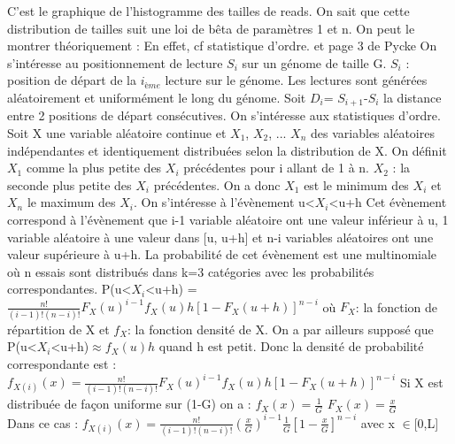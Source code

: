 \documentclass[12pt]{article}
\begin{document}
C'est le graphique de l'histogramme des tailles de reads.
On sait que cette distribution de tailles suit une loi de bêta de paramètres 1 et n.
On peut le montrer théoriquement :
En effet, cf statistique d'ordre. et page 3 de Pycke
On s'intéresse au positionnement de lecture $S_{i}$ sur un génome de taille G. $S_{i}$ : position de départ de la $i_{ème}$ lecture sur le génome.
Les lectures sont générées aléatoirement et uniformément le long du génome.
Soit $D_{i}$= $S_{i+1}$-$S_{i}$ la distance entre 2 positions de départ consécutives.
On s'intéresse aux statistiques d'ordre.
Soit X une variable aléatoire continue et $X_{1}$, $X_{2}$, ... $X_{n}$ des variables aléatoires indépendantes et identiquement distribuées selon la distribution de X.
On définit $X_{1}$ comme la plus petite des $X_{i}$ précédentes pour i allant de 1 à n.
$X_{2}$ : la seconde plus petite des $X_{i}$ précédentes.
On a donc $X_{1}$ est le minimum des $X_{i}$ et $X_{n}$ le maximum des $X_{i}$.
On s'intéresse à l'évènement u<$X_{i}$<u+h
Cet évènement correspond à l'évènement que i-1 variable aléatoire ont une valeur inférieur à u, 1 variable aléatoire à une valeur dans [u, u+h] et n-i variables aléatoires ont une valeur supérieure à u+h.
La probabilité de cet évènement est une multinomiale où n essais sont distribués dans k=3 catégories avec les probabilités correspondantes.
P(u<$X_{i}$<u+h) = $\frac{n!}{(i-1)!(n-i)!} F_X(u)^{i-1}f_X(u)h[1-F_X(u+h)]^{n-i}$
où $F_X $: la fonction de répartition de X
et $f_X $: la fonction densité de X.
On a par ailleurs supposé que P(u<$X_{i}$<u+h)$\approx f_X(u)h$ quand h est petit.
Donc la densité de probabilité correspondante est :
$f_{X(i)}(x) = \frac{n!}{(i-1)!(n-i)!} F_X(u)^{i-1}f_X(u)h[1-F_X(u+h)]^{n-i}$
Si X est distribuée de façon uniforme sur (1-G) on a :
$f_X(x)=\frac{1}{G}$  $F_X(x)=\frac{x}{G}$\\
Dans ce cas : 
$f_{X(i)}(x) = \frac{n!}{(i-1)!(n-i)!} (\frac{x}{G})^{i-1} \frac{1}{G} [1-\frac{x}{G}]^{n-i}$ avec x $ \in $[0,L]                                                                                                                                                                                                                                                                                                                                                                                                                                                                                                                                                                                                                                                       
\end{document}
